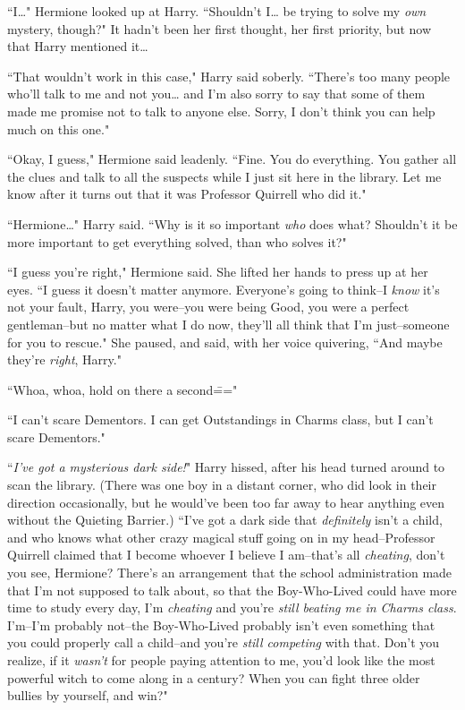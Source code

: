``I{\ldots}" Hermione looked up at Harry. ``Shouldn't I{\ldots} be trying to solve my \emph{own} mystery, though?" It hadn't been her first thought, her first priority, but now that Harry mentioned it{\ldots}

``That wouldn't work in this case," Harry said soberly. ``There's too many people who'll talk to me and not you{\ldots} and I'm also sorry to say that some of them made me promise not to talk to anyone else. Sorry, I don't think you can help much on this one."

``Okay, I guess," Hermione said leadenly. ``Fine. You do everything. You gather all the clues and talk to all the suspects while I just sit here in the library. Let me know after it turns out that it was Professor Quirrell who did it."

``Hermione{\ldots}" Harry said. ``Why is it so important \emph{who} does what? Shouldn't it be more important to get everything solved, than who solves it?"

``I guess you're right," Hermione said. She lifted her hands to press up at her eyes. ``I guess it doesn't matter anymore. Everyone's going to think\---I \emph{know} it's not your fault, Harry, you were\---you were being Good, you were a perfect gentleman\---but no matter what I do now, they'll all think that I'm just\---someone for you to rescue." She paused, and said, with her voice quivering, ``And maybe they're \emph{right}, Harry."

``Whoa, whoa, hold on there a second\==="

``I can't scare Dementors. I can get Outstandings in Charms class, but I can't scare Dementors."

``\emph{I've got a mysterious dark side!}" Harry hissed, after his head turned around to scan the library. (There was one boy in a distant corner, who did look in their direction occasionally, but he would've been too far away to hear anything even without the Quieting Barrier.) ``I've got a dark side that \emph{definitely} isn't a child, and who knows what other crazy magical stuff going on in my head\---Professor Quirrell claimed that I become whoever I believe I am\---that's all \emph{cheating}, don't you see, Hermione? There's an arrangement that the school administration made that I'm not supposed to talk about, so that the Boy-Who-Lived could have more time to study every day, I'm \emph{cheating} and you're \emph{still beating me in Charms class}. I'm\---I'm probably not\---the Boy-Who-Lived probably isn't even something that you could properly call a child\---and you're \emph{still competing} with that. Don't you realize, if it \emph{wasn't} for people paying attention to me, you'd look like the most powerful witch to come along in a century? When you can fight three older bullies by yourself, and win?"

